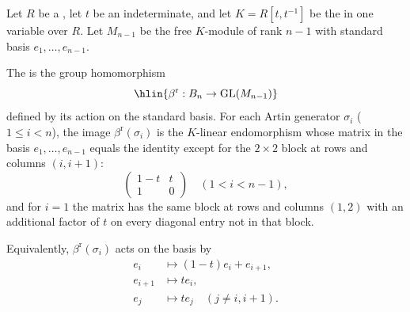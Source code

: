 \begin{definition} \label{definition:algebraic_reduced_Burau_representation_of_artin_braid_group_on_a_module_over_a_ring}
    Let $R$ be a , let $t$ be an indeterminate, and let $K = R[t, t^{-1}]$ be the  in one variable over $R$. Let $M_{n-1}$ be the free $K$-module of rank $n-1$ with standard basis $e_1, \dots, e_{n-1}$.

    The  is the group homomorphism
    $$\hlin{\beta^{\mathrm{r}}: B_n \to \operatorname{GL}(M_{n-1})}$$
    defined by its action on the standard basis. For each Artin generator $\sigma_i$ ($1 \leq i < n$), the image $\beta^{\mathrm{r}}(\sigma_i)$ is the $K$-linear endomorphism whose matrix in the basis $e_1, \dots, e_{n-1}$ equals the identity except for the $2 \times 2$ block at rows and columns $(i, i+1)$:
    $$\begin{pmatrix} 1 - t & t \\ 1 & 0 \end{pmatrix} \quad (1 < i < n-1),$$
    and for $i = 1$ the matrix has the same block at rows and columns $(1, 2)$ with an additional factor of $t$ on every diagonal entry not in that block.

    Equivalently, $\beta^{\mathrm{r}}(\sigma_i)$ acts on the basis by
    \begin{align*}
        e_i &\mapsto (1 - t)e_i + e_{i+1}, \\
        e_{i+1} &\mapsto t e_i, \\
        e_j &\mapsto t e_j \quad (j \neq i, i+1).
    \end{align*}
\end{definition}
